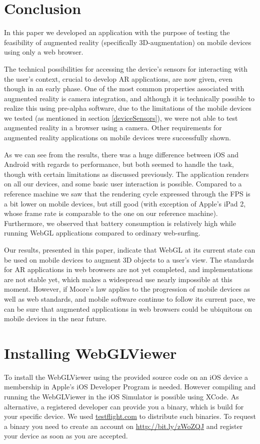 \documentclass[12pt,journal,compsoc]{IEEEtran}
\begin{document}
\section{Conclusion}
In this paper we developed an application with the purpose of testing the feasibility of augmented reality (specifically 3D-augmentation) on mobile devices using only a web browser. 

The technical possibilities for accessing the device’s sensors for interacting with the user’s context, crucial to develop AR applications, are now given, even though in an early phase. One of the most common properties associated with augmented reality is camera integration, and although it is technically possible to realize this using pre-alpha software, due to the limitations of the mobile devices we tested (as mentioned in section \ref{deviceSensors}), we were not able to test augmented reality in a browser using a camera. Other requirements for augmented reality applications on mobile devices were successfully shown.

As we can see from the results, there was a huge difference between iOS and Android with regards to performance, but both seemed to handle the task, though with certain limitations as discussed previously. The application renders on all our devices, and some basic user interaction is possible. Compared to a reference machine we saw that the rendering cycle expressed through the FPS is a bit lower on mobile devices, but still good (with exception of Apple’s iPad 2, whose frame rate is comparable to the one on our reference machine). Furthermore, we observed that battery consumption is relatively high while running WebGL applications compared to ordinary web-surfing. 

Our results, presented in this paper, indicate that WebGL at its current state can be used on mobile devices to augment 3D objects to a user’s view. The standards for AR applications in web browsers are not yet completed, and implementations are not stable yet,  which makes a widespread use nearly impossible at this moment. However, if Moore’s law \cite{Schaller1997} applies to the progression of mobile devices as well as web standards, and mobile software continue to follow its current pace, we can be sure that augmented applications in web browsers could be ubiquitous on mobile devices in the near future.





\appendices
\section*{Installing WebGLViewer}
To install the WebGLViewer using the provided source code on an iOS device a membership in Apple's iOS Developer Program is needed. However compiling and running the WebGLViewer in the iOS Simulator is possible using XCode. As alternative, a registered developer can provide you a binary, which is build for your specific device. We used \url{testflight.com} to distribute such binaries. To request a binary you need to create an account on \url{http://bit.ly/zWoZQJ} and register your device as soon as you are accepted.



\ifCLASSOPTIONcaptionsoff
  \newpage
\fi





\end{document}

